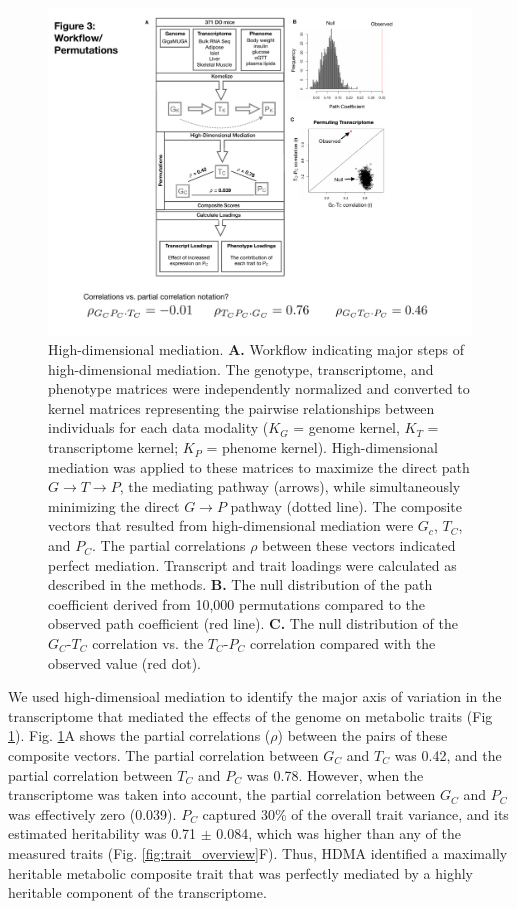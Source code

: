 \documentclass[
]{article}
\begin{document}
\begin{figure}[ht!]
\includegraphics[width=5in]{Figures/Fig3_workflow.pdf} 
\caption{High-dimensional mediation. \textbf{A.} Workflow indicating 
major steps of high-dimensional mediation. The genotype, transcriptome, 
and phenotype matrices were independently normalized and converted to 
kernel matrices representing the pairwise relationships between 
individuals for each data modality ($K_G$ = genome kernel, $K_T$ = 
transcriptome kernel; $K_P$ = phenome kernel). 
High-dimensional mediation was applied to these matrices to maximize the 
direct path $G \rightarrow T \rightarrow P$, the mediating pathway (arrows), 
while simultaneously minimizing the direct $G \rightarrow P$ pathway (dotted 
line). The composite vectors that resulted from high-dimensional mediation were 
$G_c$, $T_C$, and $P_C$. The partial correlations $\rho$ between these vectors 
indicated perfect mediation. Transcript and trait loadings were calculated 
as described in the methods. \textbf{B.} The null distribution of the path 
coefficient derived from 10,000 permutations compared to the observed path 
coefficient (red line). \textbf{C.} The null distribution of the $G_C$-$T_C$ 
correlation vs. the $T_C$-$P_C$ correlation compared with the observed value 
(red dot).
}
\label{fig:workflow}
\end{figure}

We used high-dimensioal mediation to identify the major axis of
variation in the transcriptome that mediated the effects of the genome
on metabolic traits (Fig \ref{fig:workflow}). Fig. \ref{fig:workflow}A
shows the partial correlations (\(\rho\)) between the pairs of these
composite vectors. The partial correlation between \(G_C\) and \(T_C\)
was 0.42, and the partial correlation between \(T_C\) and \(P_C\) was
0.78. However, when the transcriptome was taken into account, the
partial correlation between \(G_C\) and \(P_C\) was effectively zero
(0.039). \(P_C\) captured 30\% of the overall trait variance, and its
estimated heritability was 0.71 \(\pm\) 0.084, which was higher than any
of the measured traits (Fig. \ref{fig:trait_overview}F). Thus, HDMA
identified a maximally heritable metabolic composite trait that was
perfectly mediated by a highly heritable component of the transcriptome.
\end{document}
